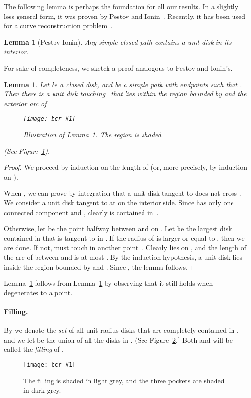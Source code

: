 \documentclass[a4paper]{article}
\newtheorem{lemma}[theorem]{Lemma}
\newcommand{\epsfigure}[2]{
  \begin{figure}[htb]
    \centerline{\texttt{[image: bcr-\#1]}}
    \caption{#2}
    \label{f:#1}
  \end{figure}}
\begin{document}
The following lemma is perhaps the foundation for all our results.  In
a slightly less general form, it was proven by Pestov and
Ionin~\cite{pi-lpcigcc-59}.
Recently, it has been used for a curve 
reconstruction problem~\cite{gt-rcdc-05}. 
\begin{lemma}[Pestov-Ionin]\label{l:gPI}
  Any simple closed path contains a unit disk in its interior.
\end{lemma}
For sake of completeness, we sketch a proof analogous to
Pestov and Ionin's.
\begin{lemma}\label{l:ggPI}
  Let  be a closed disk, and  be a simple 
  path with endpoints  such that . 
  Then there is a unit disk touching~ that
  lies within the region  bounded by  and the exterior
  arc of  
\epsfigure{pestov}{Illustration of Lemma~\ref{l:ggPI}. The 
  region  is shaded.}
(See Figure~\ref{f:pestov}).
\end{lemma}
\begin{proof}
  We proceed by induction on the length  of  (or, more
  precisely, by induction on ).
  
  When , we can prove by integration that a unit disk
  tangent to  does not cross . We consider a unit disk
   tangent to  at  on the interior
  side.  Since  has only one connected component and
  , clearly  is contained in~.
  
  Otherwise, let  be the point halfway between  and  on
  . Let  be the largest disk contained in  that
  is tangent to  in .  If the radius of  is larger or
  equal to , then we are done.  If not,  must touch
   in another point~.  Clearly  lies on
  , and the length of the arc  of  between
   and  is at most .  By the induction hypothesis, a
  unit disk  lies inside the region  bounded by
   and . Since , the
  lemma follows.
\end{proof}
Lemma~\ref{l:gPI} follows from Lemma~\ref{l:ggPI} by observing that it
still holds when  degenerates to a point.

\paragraph{Filling.}

By  we denote the \emph{set} of all unit-radius disks that
are completely contained in , and we let  be the union of
all the disks in . (See Figure~\ref{f:elp}.)  Both 
and  will be called the \emph{filling} of .
\epsfigure{elp}{The filling  is shaded in light grey, and the 
three pockets are shaded in dark grey.}
\end{document}
